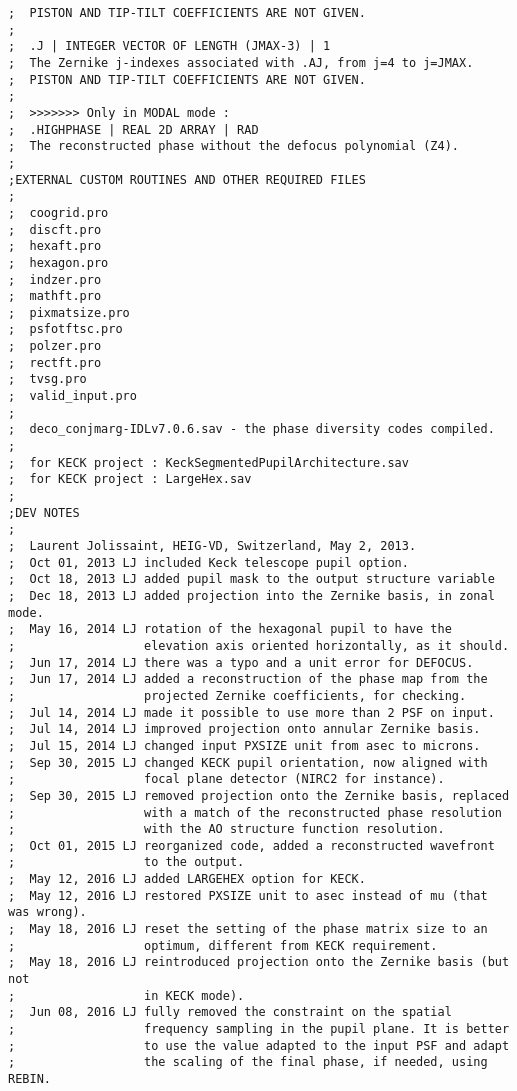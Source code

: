 \begin{lstlisting}
;  PISTON AND TIP-TILT COEFFICIENTS ARE NOT GIVEN.
;
;  .J | INTEGER VECTOR OF LENGTH (JMAX-3) | 1
;  The Zernike j-indexes associated with .AJ, from j=4 to j=JMAX.
;  PISTON AND TIP-TILT COEFFICIENTS ARE NOT GIVEN.
;
;  >>>>>>> Only in MODAL mode : 
;  .HIGHPHASE | REAL 2D ARRAY | RAD
;  The reconstructed phase without the defocus polynomial (Z4).
;  
;EXTERNAL CUSTOM ROUTINES AND OTHER REQUIRED FILES
;
;  coogrid.pro
;  discft.pro
;  hexaft.pro
;  hexagon.pro
;  indzer.pro
;  mathft.pro
;  pixmatsize.pro
;  psfotftsc.pro
;  polzer.pro
;  rectft.pro
;  tvsg.pro
;  valid_input.pro
;
;  deco_conjmarg-IDLv7.0.6.sav - the phase diversity codes compiled.
;
;  for KECK project : KeckSegmentedPupilArchitecture.sav
;  for KECK project : LargeHex.sav
;
;DEV NOTES
;
;  Laurent Jolissaint, HEIG-VD, Switzerland, May 2, 2013.
;  Oct 01, 2013 LJ included Keck telescope pupil option.
;  Oct 18, 2013 LJ added pupil mask to the output structure variable
;  Dec 18, 2013 LJ added projection into the Zernike basis, in zonal mode.
;  May 16, 2014 LJ rotation of the hexagonal pupil to have the
;                  elevation axis oriented horizontally, as it should.
;  Jun 17, 2014 LJ there was a typo and a unit error for DEFOCUS.
;  Jun 17, 2014 LJ added a reconstruction of the phase map from the
;                  projected Zernike coefficients, for checking.
;  Jul 14, 2014 LJ made it possible to use more than 2 PSF on input.
;  Jul 14, 2014 LJ improved projection onto annular Zernike basis.
;  Jul 15, 2014 LJ changed input PXSIZE unit from asec to microns.
;  Sep 30, 2015 LJ changed KECK pupil orientation, now aligned with
;                  focal plane detector (NIRC2 for instance).
;  Sep 30, 2015 LJ removed projection onto the Zernike basis, replaced
;                  with a match of the reconstructed phase resolution
;                  with the AO structure function resolution.
;  Oct 01, 2015 LJ reorganized code, added a reconstructed wavefront
;                  to the output.
;  May 12, 2016 LJ added LARGEHEX option for KECK.
;  May 12, 2016 LJ restored PXSIZE unit to asec instead of mu (that was wrong).
;  May 18, 2016 LJ reset the setting of the phase matrix size to an
;                  optimum, different from KECK requirement.
;  May 18, 2016 LJ reintroduced projection onto the Zernike basis (but not
;                  in KECK mode).
;  Jun 08, 2016 LJ fully removed the constraint on the spatial
;                  frequency sampling in the pupil plane. It is better
;                  to use the value adapted to the input PSF and adapt
;                  the scaling of the final phase, if needed, using REBIN.

\end{lstlisting}
